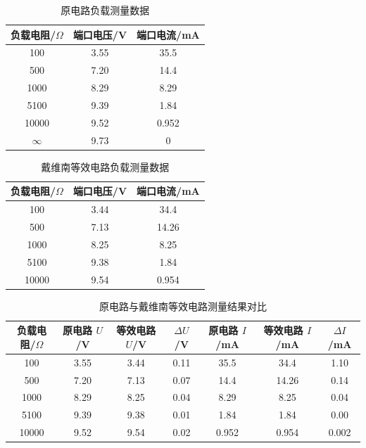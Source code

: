 \begin{table}[H]
    \centering
    \caption{原电路负载测量数据}
    \label{e3-tab:original-load}
    \begin{tabular}{ccc}
        \toprule
        负载电阻/\(\Omega\) & 端口电压/V & 端口电流/mA \\
        \midrule
        100 & 3.55 & 35.5 \\
        500 & 7.20 & 14.4 \\
        1000 & 8.29 & 8.29 \\
        5100 & 9.39 & 1.84 \\
        10000 & 9.52 & 0.952 \\
        \(\infty\) & 9.73 & 0 \\
        \bottomrule
    \end{tabular}
\end{table}

\begin{table}[H]
    \centering
    \caption{戴维南等效电路负载测量数据}
    \label{e3-tab:equivalent-load}
    \begin{tabular}{ccc}
        \toprule
        负载电阻/\(\Omega\) & 端口电压/V & 端口电流/mA \\
        \midrule
        100 & 3.44 & 34.4 \\
        500 & 7.13 & 14.26 \\
        1000 & 8.25 & 8.25 \\
        5100 & 9.38 & 1.84 \\
        10000 & 9.54 & 0.954 \\
        \bottomrule
    \end{tabular}
\end{table}

\begin{table}[H]
    \centering
    \caption{原电路与戴维南等效电路测量结果对比}
    \label{e3-tab:load-comparison}
    \begin{tabular}{ccccccc}
        \toprule
        负载电阻/\(\Omega\) & 原电路 \(U\)/V & 等效电路 \(U\)/V & \(\Delta U\)/V & 原电路 \(I\)/mA & 等效电路 \(I\)/mA & \(\Delta I\)/mA \\
        \midrule
        100 & 3.55 & 3.44 & 0.11 & 35.5 & 34.4 & 1.10 \\
        500 & 7.20 & 7.13 & 0.07 & 14.4 & 14.26 & 0.14 \\
        1000 & 8.29 & 8.25 & 0.04 & 8.29 & 8.25 & 0.04 \\
        5100 & 9.39 & 9.38 & 0.01 & 1.84 & 1.84 & 0.00 \\
        10000 & 9.52 & 9.54 & 0.02 & 0.952 & 0.954 & 0.002 \\
        \bottomrule
    \end{tabular}
\end{table}

